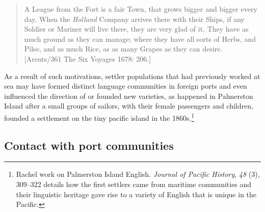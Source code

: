 \begin{quotation}
A League from the Fort is a fair Town, that grows bigger and bigger every day. When the \textit{Holland} Company arrives there with their Ships, if any Soldier or Mariner will live there, they are very glad of it. They have as much ground as they can manage; where they have all sorts of Herbs, and Pilse, and as much Rice, as as many Grapes as they can desire. [Arents/361 The Six {Voyages 1678}: 206.]
\end{quotation}

As a result of such motivations, settler populations that had previously worked at sea may have formed distinct language communities in foreign ports and even influenced the direction of  or founded new varieties, as happened in Palmerston Island after a small groups of sailors, with their female passengers and children, founded a settlement on the tiny pacific island in the 1860s.\footnote{Rachel  work on Palmerston Island English. \textit{Journal of Pacific History}, \textit{48} (3), 309–322 details how the first settlers came from maritime communities and their linguistic heritage gave rise to a variety of English that is unique in the Pacific.} 

\subsection{{Contact with port communities}}\label{sec:4.3.6}

